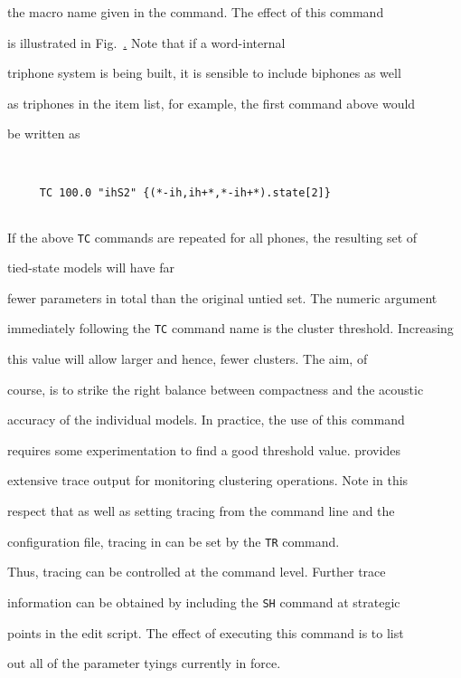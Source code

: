 the macro  name given in the command.   The effect of this command 


is illustrated in Fig.~\href{f:tiedstate}.  Note that if a word-internal


triphone system is being built, it is sensible to include biphones as well


as triphones in the item list, for example, the first command above would


be written as


\begin{verbatim}


     TC 100.0 "ihS2" {(*-ih,ih+*,*-ih+*).state[2]}


\end{verbatim}


If the above \texttt{TC} commands are repeated for all phones, the resulting  set of


tied-state models will have far


fewer parameters in total than the original untied set.  The numeric argument


immediately following the \texttt{TC} command name is the cluster threshold.  Increasing


this value will allow larger and hence, fewer clusters. The aim, of


course, is to strike the right balance between compactness and the acoustic


accuracy of the individual models.  In practice, the use of this command


requires some experimentation to find a good threshold value.  provides


extensive trace  output for monitoring clustering operations.  Note in this


respect that as well as setting tracing from the command line and the


configuration file, tracing in  can be set by the \texttt{TR} command. 


Thus,  tracing can be controlled at the command level. Further trace


information can be obtained by including the \texttt{SH} command at strategic


points in the edit script.  The effect of executing this command is to list


out all of the parameter tyings currently in force.





